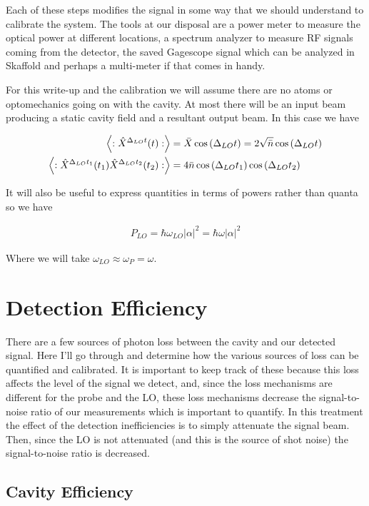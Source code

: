 \documentclass[12pt]{article}
\begin{document}
Each of these steps modifies the signal in some way that we should understand to calibrate the system. The tools at our disposal are a power meter to measure the optical power at different locations, a spectrum analyzer to measure RF signals coming from the detector, the saved Gagescope signal which can be analyzed in Skaffold and perhaps a multi-meter if that comes in handy.

For this write-up and the calibration we will assume there are no atoms or optomechanics going on with the cavity. At most there will be an input beam producing a static cavity field and a resultant output beam. In this case we have

\begin{align}
\Braket{:\hat{X}^{\Delta_{LO}t}(t):} &= \bar{X} \cos\left(\Delta_{LO}t\right) = 2 \sqrt{\bar{n}}\cos\left(\Delta_{LO}t\right)\\
\Braket{:\hat{X}^{\Delta_{LO}t_1}(t_1)\hat{X}^{\Delta_{LO}t_2}(t_2):} &= 4\bar{n} \cos\left(\Delta_{LO}t_1\right)\cos\left(\Delta_{LO}t_2\right)
\end{align}

It will also be useful to express quantities in terms of powers rather than quanta so we have

\begin{align}
P_{LO} = \hbar \omega_{LO} \lvert \alpha \rvert ^2 = \hbar \omega \lvert \alpha \rvert^2
\end{align}

Where we will take $\omega_{LO} \approx \omega_{P} = \omega$.

\section{Detection Efficiency}

There are a few sources of photon loss between the cavity and our detected signal. Here I'll go through and determine how the various sources of loss can be quantified and calibrated. It is important to keep track of these because this loss affects the level of the signal we detect, and, since the loss mechanisms are different for the probe and the LO, these loss mechanisms decrease the signal-to-noise ratio of our measurements which is important to quantify. In this treatment the effect of the detection inefficiencies is to simply attenuate the signal beam. Then, since the LO is not attenuated (and this is the source of shot noise) the signal-to-noise ratio is decreased.

\subsection{Cavity Efficiency}
\end{document}
